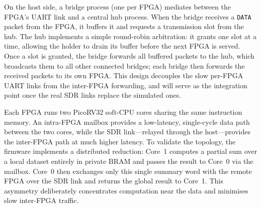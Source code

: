 \documentclass{article}
\begin{document}
On the host side, a bridge process (one per FPGA) mediates between the FPGA's UART link and a central hub process. When the bridge receives a \texttt{DATA} packet from the FPGA, it buffers it and requests a transmission slot from the hub. The hub implements a simple round-robin arbitration: it grants one slot at a time, allowing the holder to drain its buffer before the next FPGA is served. Once a slot is granted, the bridge forwards all buffered packets to the hub, which broadcasts them to all other connected bridges; each bridge then forwards the received packets to its own FPGA. This design decouples the slow per-FPGA UART links from the inter-FPGA forwarding, and will serve as the integration point once the real SDR links replace the simulated ones.

Each FPGA runs two PicoRV32 soft-CPU cores sharing the same instruction memory. An intra-FPGA mailbox provides a low-latency, single-cycle data path between the two cores, while the SDR link---relayed through the host---provides the inter-FPGA path at much higher latency. To validate the topology, the firmware implements a distributed reduction: Core~1 computes a partial sum over a local dataset entirely in private BRAM and passes the result to Core~0 via the mailbox. Core~0 then exchanges only this single summary word with the remote FPGA over the SDR link and returns the global result to Core~1. This asymmetry deliberately concentrates computation near the data and minimises slow inter-FPGA traffic.
\end{document}
